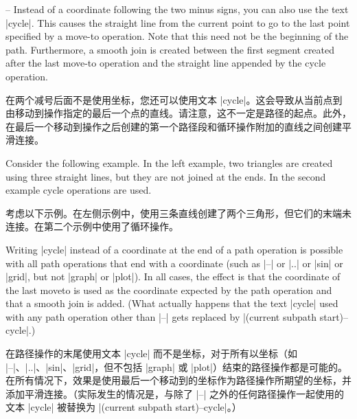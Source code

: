 \begin{pathoperation}{--}{}
    Instead of a coordinate following the two minus signs, you can also use the
    text |cycle|. This causes the straight line from the current point to go to
    the last point specified by a move-to operation. Note that this need not be
    the beginning of the path. Furthermore, a smooth join is created between
    the first segment created after the last move-to operation and the straight
    line appended by the cycle operation.

    在两个减号后面不是使用坐标，您还可以使用文本 |cycle|。这会导致从当前点到由移动到操作指定的最后一个点的直线。请注意，这不一定是路径的起点。此外，在最后一个移动到操作之后创建的第一个路径段和循环操作附加的直线之间创建平滑连接。



    Consider the following example. In the left example, two triangles are
    created using three straight lines, but they are not joined at the ends. In
    the second example cycle operations are used.
    
    考虑以下示例。在左侧示例中，使用三条直线创建了两个三角形，但它们的末端未连接。在第二个示例中使用了循环操作。


\begin{codeexample}[]
\end{codeexample}
\end{pathoperation}

Writing |cycle| instead of a coordinate at the end of a path operation is
possible with all path operations that end with a coordinate (such as |--| or
|..| or |sin| or |grid|, but not |graph| or |plot|). In all cases, the effect
is that the coordinate of the last moveto is used as the coordinate expected by
the path operation and that a smooth join is added. (What actually happens that
the text |cycle| used with any path operation other than |--| gets replaced by
|(current subpath start)--cycle|.)

在路径操作的末尾使用文本 |cycle| 而不是坐标，对于所有以坐标（如 |--|、|..|、|sin|、|grid|，但不包括 |graph| 或 |plot|）结束的路径操作都是可能的。在所有情况下，效果是使用最后一个移动到的坐标作为路径操作所期望的坐标，并添加平滑连接。（实际发生的情况是，与除了 |--| 之外的任何路径操作一起使用的文本 |cycle| 被替换为 |(current subpath start)--cycle|。）



